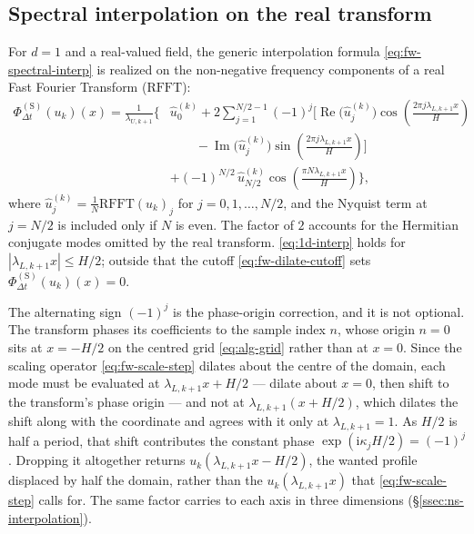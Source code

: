 \documentclass{article}
\begin{document}
\subsection{Spectral interpolation on the real transform}\label{ssec:1d-interpolation}

For $d = 1$ and a real-valued field, the generic interpolation formula
\eqref{eq:fw-spectral-interp} is realized on the non-negative frequency
components of a real Fast Fourier Transform ($\mathrm{RFFT}$):
\begin{equation}\label{eq:1d-interp}
  \begin{split}
    \Phi_{\Delta t}^{(\mathrm{S})}(u_k)(x) = \frac{1}{\lambda_{U,k+1}}\biggl\{ &\hat{u}_0^{(k)}
      + 2 \sum_{j=1}^{N/2-1} (-1)^j \biggl[ \operatorname{Re}\bigl(\hat{u}_j^{(k)}\bigr) \cos\left(\frac{2\pi j \lambda_{L,k+1} x}{H}\right) \\
      &\qquad - \operatorname{Im}\bigl(\hat{u}_j^{(k)}\bigr) \sin\left(\frac{2\pi j \lambda_{L,k+1} x}{H}\right) \biggr] \\
      &+ (-1)^{N/2}\, \hat{u}_{N/2}^{(k)} \cos\left(\frac{\pi N \lambda_{L,k+1} x}{H}\right) \biggr\},
  \end{split}
\end{equation}
where $\hat{u}_j^{(k)} = \frac{1}{N} \mathrm{RFFT}(u_k)_j$ for
$j = 0, 1, \dots, N/2$, and the Nyquist term at $j = N/2$ is included only if
$N$ is even. The factor of $2$ accounts for the Hermitian conjugate modes
omitted by the real transform. \eqref{eq:1d-interp} holds for
$|\lambda_{L,k+1} x| \le H/2$; outside that the cutoff
\eqref{eq:fw-dilate-cutoff} sets $\Phi_{\Delta t}^{(\mathrm{S})}(u_k)(x) = 0$.

The alternating sign $(-1)^j$ is the phase-origin correction, and it is not
optional. The transform phases its coefficients to the sample index $n$, whose
origin $n = 0$ sits at $x = -H/2$ on the centred grid \eqref{eq:alg-grid}
rather than at $x = 0$. Since the scaling operator \eqref{eq:fw-scale-step}
dilates about the centre of the domain, each mode must be evaluated at
$\lambda_{L,k+1} x + H/2$ --- dilate about $x = 0$, then shift to the
transform's phase origin --- and not at $\lambda_{L,k+1}(x + H/2)$, which
dilates the shift along with the coordinate and agrees with it only at
$\lambda_{L,k+1} = 1$. As $H/2$ is half a period, that shift contributes the
constant phase $\exp(\mathrm{i} \kappa_j H / 2) = (-1)^j$. Dropping it altogether
returns $u_k\!\left(\lambda_{L,k+1} x - H/2\right)$, the wanted profile
displaced by half the domain, rather than the
$u_k\!\left(\lambda_{L,k+1} x\right)$ that \eqref{eq:fw-scale-step} calls for.
The same factor carries to each axis in three dimensions
(\S\ref{ssec:ns-interpolation}).
\end{document}
